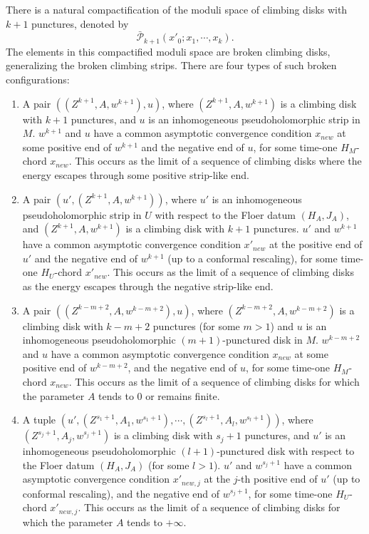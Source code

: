 \documentclass{amsart}
\numberwithin{equation}{section}
\numberwithin{figure}{section}
\begin{document}
	There is a natural compactification of the moduli space of climbing disks with $k+1$ punctures, denoted by
\begin{equation*}
\bar{\mathcal{P}}_{k+1}(x'_{0}; x_{1}, \cdots, x_{k}).
\end{equation*}
The elements in this compactified moduli space are broken climbing disks, generalizing the broken climbing strips. There are four types of such broken configurations:
\begin{enumerate}[label=(\roman*)]

\item A pair $((Z^{k+1}, A, w^{k+1}), u)$, where $(Z^{k+1}, A, w^{k+1})$ is a climbing disk with $k+1$ punctures, and $u$ is an inhomogeneous pseudoholomorphic strip in $M$. $w^{k+1}$ and $u$ have a common asymptotic convergence condition $x_{new}$ at some positive end of $w^{k+1}$ and the negative end of $u$, for some time-one $H_{M}$-chord $x_{new}$. This occurs as the limit of a sequence of climbing disks where the energy escapes through some positive strip-like end.

\item A pair $(u', (Z^{k+1}, A, w^{k+1}))$, where $u'$ is an inhomogeneous pseudoholomorphic strip in $U$ with respect to the Floer datum $(H_{A}, J_{A})$, and $(Z^{k+1}, A, w^{k+1})$ is a climbing disk with $k+1$ punctures. $u'$ and $w^{k+1}$ have a common asymptotic convergence condition $x'_{new}$ at the positive end of $u'$ and the negative end of $w^{k+1}$ (up to a conformal rescaling), for some time-one $H_{U}$-chord $x'_{new}$. This occurs as the limit of a sequence of climbing disks as the energy escapes through the negative strip-like end.

\item A pair $((Z^{k-m+2}, A, w^{k-m+2}), u)$, where $(Z^{k-m+2}, A, w^{k-m+2})$ is a climbing disk with $k-m+2$ punctures (for some $m > 1$) and $u$ is an inhomogeneous pseudoholomorphic $(m+1)$-punctured disk in $M$. $w^{k-m+2}$ and $u$ have a common asymptotic convergence condition $x_{new}$ at some positive end of $w^{k-m+2}$, and the negative end of $u$, for some time-one $H_{M}$-chord $x_{new}$. This occurs as the limit of a sequence of climbing disks for which the parameter $A$ tends to $0$ or remains finite.

\item A tuple $(u', (Z^{s_{1}+1}, A_{1}, w^{s_{1}+1}), \cdots, (Z^{s_{l}+1}, A_{l}, w^{s_{l}+1}))$, where $(Z^{s_{j}+1}, A_{j}, w^{s_{j}+1})$ is a climbing disk with $s_{j}+1$ punctures, and $u'$ is an inhomogeneous pseudoholomorphic $(l+1)$-punctured disk with respect to the Floer datum $(H_{A}, J_{A})$ (for some $l > 1$). $u'$ and $w^{s_{j}+1}$ have a common asymptotic convergence condition $x'_{new, j}$ at the $j$-th positive end of $u'$ (up to conformal rescaling), and the negative end of $w^{s_{j}+1}$, for some time-one $H_{U}$-chord $x'_{new, j}$. This occurs as the limit of a sequence of climbing disks for which the parameter $A$ tends to $+\infty$.

\end{enumerate}
\end{document}
